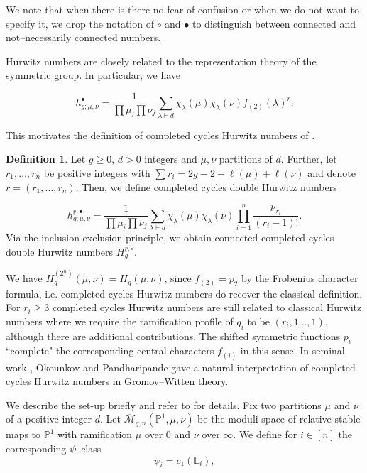 \documentclass[10pt,a4paper,oneside,no-math,reqno]{amsart}%
\theoremstyle{plain}
\theoremstyle{definition}
\newtheorem{definition}[theorem]{Definition}
\theoremstyle{remark}
\numberwithin{equation}{section}
\newcommand{\1}{\mathds{1}}
\newcommand{\<}{\langle}
\renewcommand{\>}{\rangle}
\begin{document}
We note that when there is there no fear of confusion or when we do not want to specify it, we drop the notation of $\circ$ and $\bullet$ to distinguish between connected and not--necessarily connected numbers.

Hurwitz numbers are closely related to the representation theory of the symmetric group. In particular, we have

\begin{equation}
    h^\bullet_{g;\mu,\nu}
    =
    \frac{1}{\prod \mu_i\prod\nu_j} \sum_{\lambda\vdash d} \chi_\lambda(\mu) \chi_\lambda(\nu) f_{(2)}(\lambda)^r.
\end{equation}

This motivates the definition of completed cycles Hurwitz numbers of \cite{OP06a}.

\begin{definition}\label{CCHNdef}
    Let $g\ge0$, $d>0$ integers and $\mu,\nu$ partitions of $d$. Further, let $r_1,\dots,r_n$ be positive integers with $\sum r_i=2g-2+\ell(\mu)+\ell(\nu)$ and denote $\underline{r}=(r_1,\dots,r_n)$. Then, we define completed cycles double Hurwitz numbers

    \begin{equation}
        h^{\underline{r},\bullet}_{g;\mu,\nu}
        =
        \frac{1}{\prod \mu_i\prod\nu_j} \sum_{\lambda\vdash d} \chi_\lambda(\mu) \chi_\lambda(\nu) \prod_{i=1}^n \frac{p_{r_i}}{(r_i-1)!}.
    \end{equation}
    Via the inclusion-exclusion principle, we obtain connected completed cycles double Hurwitz numbers $H_g^{\underline{r},\circ}$.
\end{definition}

We have $H_g^{(2^n)}(\mu,\nu) = H_g(\mu,\nu)$, since $f_{(2)}=p_2$ by the Frobenius character formula, i.e. completed cycles Hurwitz numbers do recover the classical definition. For $r_i \ge 3 $ completed cycles Hurwitz numbers are still related to classical Hurwitz numbers where we require the ramification profile of $q_i$ to be $(r_i,1\dots,1)$, although there are additional contributions. The shifted symmetric functions $p_i$ ``complete" the corresponding central characters $f_{(i)}$ in this sense. In seminal work \cite{OP06a}, Okounkov and Pandharipande gave a natural interpretation of completed cycles Hurwitz numbers in Gromov--Witten theory.

We describe the set-up briefly and refer to \cite{OP06a} for details. Fix two partitions $\mu$ and $\nu$ of a positive integer $d$. Let $\overline{\mathcal{M}}_{g,n}(\mathbb{P}^1,\mu,\nu)$ be the moduli space of relative stable maps to $\mathbb{P}^1$ with ramification $\mu$ over $0$ and $\nu$ over $\infty$. We define for $i\in[n]$ the corresponding $\psi$--class
\begin{equation}
    \psi_i
    =
    c_1(\mathbb{L}_i),
\end{equation}
\end{document}
